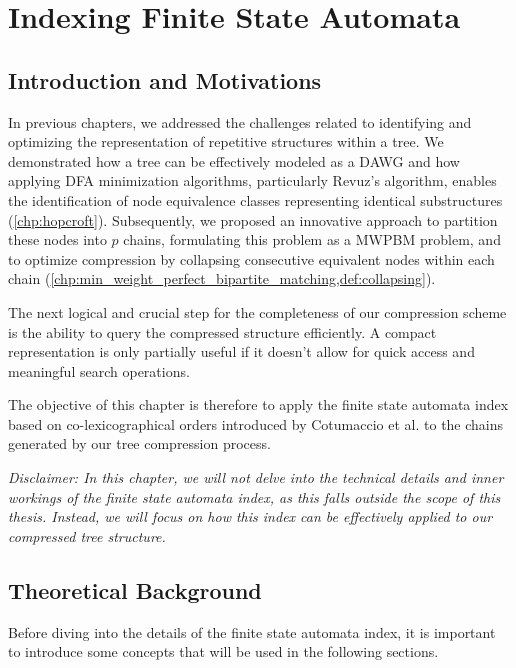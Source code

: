 \chapter{Indexing Finite State Automata} \label{chp:indexing}
\section{Introduction and Motivations}
In previous chapters, we addressed the challenges related to identifying and optimizing the representation of repetitive structures within a tree. We demonstrated how a tree can be effectively modeled as a DAWG and how applying DFA minimization algorithms, particularly Revuz's algorithm, enables the identification of node equivalence classes representing identical substructures (\cref{chp:hopcroft}). Subsequently, we proposed an innovative approach to partition these nodes into $p$ chains, formulating this problem as a MWPBM problem, and to optimize compression by collapsing consecutive equivalent nodes within each chain (\cref{chp:min_weight_perfect_bipartite_matching,def:collapsing}).

The next logical and crucial step for the completeness of our compression scheme is the ability to query the compressed structure efficiently. A compact representation is only partially useful if it doesn't allow for quick access and meaningful search operations.

The objective of this chapter is therefore to apply the finite state automata index based on co-lexicographical orders introduced by Cotumaccio et al. \cite{cotumaccio2023co} to the chains generated by our tree compression process.

\textit{Disclaimer: In this chapter, we will not delve into the technical details and inner workings of the finite state automata index, as this falls outside the scope of this thesis. Instead, we will focus on how this index can be effectively applied to our compressed tree structure.}

\section{Theoretical Background}
Before diving into the details of the finite state automata index, it is important to introduce some concepts that will be used in the following sections.

